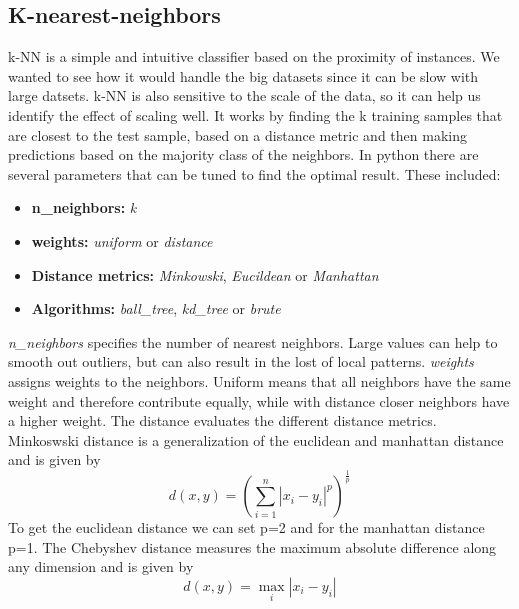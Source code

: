 \documentclass{article}
\begin{document}
\subsection{K-nearest-neighbors}
k-NN is a simple and intuitive classifier based on the proximity of instances. We wanted to see how it would handle the big datasets since it can be slow with large datsets. k-NN is also sensitive to the scale of the data, so it can help us identify the effect of scaling well. It works by finding the k training samples that are closest to the test sample, based on a distance metric and then making predictions based on the majority class of the neighbors.
In python there are several parameters that can be tuned to find the optimal result. These included:
\begin{itemize}
    \item \textbf{n\_neighbors:} \textit{k}
    \item \textbf{weights:} \textit{uniform} or \textit{distance}
    \item \textbf{Distance metrics:} \textit{Minkowski}, \textit{Eucildean} or \textit{Manhattan}
    \item \textbf{Algorithms:} \textit{ball\_tree}, \textit{kd\_tree} or \textit{brute}
\end{itemize}
\noindent \textit{n\_neighbors} specifies the number of nearest neighbors. Large values can help to smooth out outliers, but can also result in the lost of local patterns. 
\textit{weights} assigns weights to the neighbors. Uniform means that all neighbors have the same weight and therefore contribute equally, while with distance closer neighbors have a higher weight.
The distance evaluates the different distance metrics. Minkoswski distance is a generalization of the euclidean and manhattan distance and is given by 
\[
d(x, y) = \left( \sum_{i=1}^{n} |x_i - y_i|^p \right)^{\frac{1}{p}}
\]
To get the euclidean distance we can set p=2 and for the manhattan distance p=1.  The Chebyshev distance measures the maximum absolute difference along any dimension and is given by
\[
d(x, y) = \max_{i} |x_i - y_i|
\]
\end{document}
